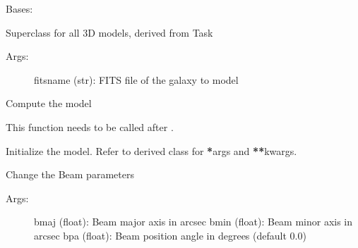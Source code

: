 \documentclass[letterpaper,10pt,english]{sphinxmanual}
\begin{document}

\begin{fulllineitems}
\label{\detokenize{pybb_api:pyBBarolo.pyBBarolo.Model3D}}
Bases: {\hyperref[\detokenize{pybb_api:pyBBarolo.pyBBarolo.Task}]{}}

Superclass for all 3D models, derived from Task
\begin{description}
\item[{Args:}] \leavevmode
fitsname (str): FITS file of the galaxy to model

\end{description}

\begin{fulllineitems}
\label{\detokenize{pybb_api:pyBBarolo.pyBBarolo.Model3D.compute}}
Compute the model

This function needs to be called after {\hyperref[\detokenize{pybb_api:pyBBarolo.pyBBarolo.Model3D.init}]{}}.

\end{fulllineitems}


\begin{fulllineitems}
\label{\detokenize{pybb_api:pyBBarolo.pyBBarolo.Model3D.init}}
Initialize the model. Refer to derived class for {\color{red}\bfseries{}*}args and {\color{red}\bfseries{}**}kwargs.

\end{fulllineitems}


\begin{fulllineitems}
\label{\detokenize{pybb_api:pyBBarolo.pyBBarolo.Model3D.set_beam}}
Change the Beam parameters
\begin{description}
\item[{Args:}] \leavevmode
bmaj (float): Beam major axis in arcsec
bmin (float): Beam minor axis in arcsec
bpa  (float): Beam position angle in degrees (default 0.0)


\end{description}
\end{fulllineitems}
\end{fulllineitems}
\end{document}
